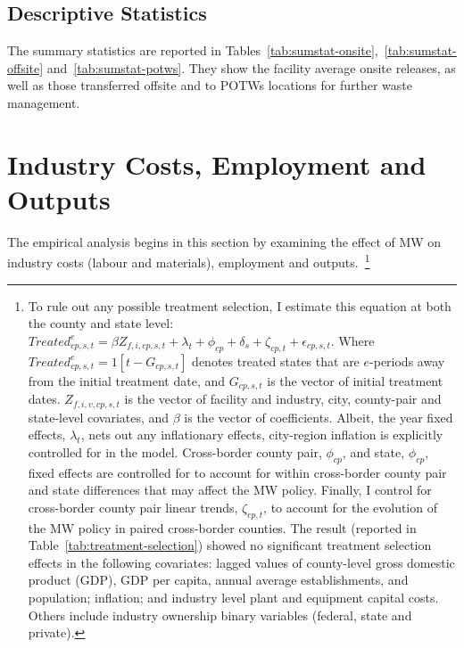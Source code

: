 \documentclass[12pt, english]{article}
\begin{document}
    \subsection{Descriptive Statistics}\label{subsec:descriptive-statistics}
    The summary statistics are reported in Tables~\ref{tab:sumstat-onsite},~\ref{tab:sumstat-offsite} and~\ref{tab:sumstat-potws}. They show the facility average onsite releases, as well as those transferred offsite and to POTWs locations for further waste management.
    
    
    


    \section{Industry Costs, Employment and Outputs}\label{sec:industry-costs-employment-and-outputs}
    The empirical analysis begins in this section by examining the effect of MW on industry costs (labour and materials), employment and outputs.~\footnote{\tiny To rule out any possible treatment selection, I estimate this equation at both the county and state level: $Treated_{cp,s,t}^e = \beta Z_{f,i,cp,s,t} + \lambda_{t} + \phi_{cp} + \delta_{s} + \zeta_{cp,t} + \epsilon_{cp,s,t}$. Where $Treated_{cp,s,t}^e = 1[t - G_{cp,s,t}]$ denotes treated states that are $e$-periods away from the initial treatment date, and $G_{cp,s,t}$ is the vector of initial treatment dates. $Z_{f,i,v,cp,s,t}$ is the vector of facility and industry, city, county-pair and state-level covariates, and $\beta$ is the vector of coefficients. Albeit, the year fixed effects, $\lambda_{t}$, nets out any inflationary effects, city-region inflation is explicitly controlled for in the model. Cross-border county pair, $\phi_{cp}$, and state, $\phi_{cp}$, fixed effects are controlled for to account for within cross-border county pair and state differences that may affect the MW policy. Finally, I control for cross-border county pair linear trends, $\zeta_{cp,t}$, to account for the evolution of the MW policy in paired cross-border counties. The result (reported in Table~\ref{tab:treatment-selection}) showed no significant treatment selection effects in the following covariates: lagged values of county-level gross domestic product (GDP), GDP per capita, annual average establishments, and population; inflation; and industry level plant and equipment capital costs. Others include industry ownership binary variables (federal, state and private).}
\end{document}
